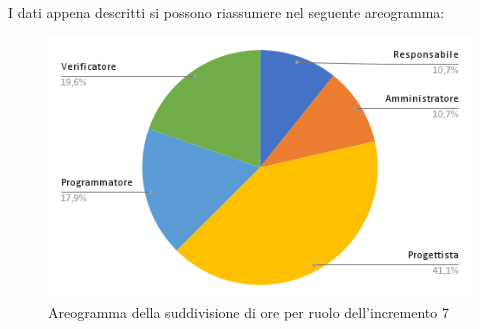\pagebreak
I dati appena descritti si possono riassumere nel seguente areogramma:
\begin{figure}[!h]
    \vspace{5px}
    \includegraphics[scale=0.5]{../../../Images/Diagrammi/Diagramma a torta/areogrammaIncremento7.png}
    \centering
    \caption{Areogramma della suddivisione di ore per ruolo dell'incremento 7}
\end{figure}

